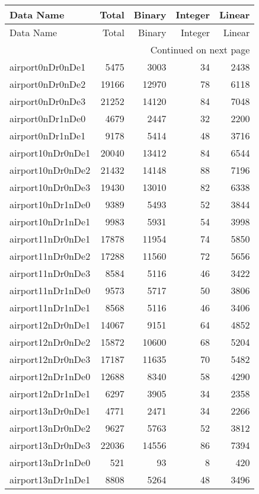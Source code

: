 \begin{longtable}{lrrrr}
\toprule
Data Name & Total & Binary & Integer & Linear \\
\midrule
\endfirsthead
\toprule
Data Name & Total & Binary & Integer & Linear \\
\midrule
\endhead
\midrule
\multicolumn{5}{r}{Continued on next page} \\
\midrule
\endfoot
\bottomrule
\endlastfoot
airport0nDr0nDe1 & 5475 & 3003 & 34 & 2438 \\
airport0nDr0nDe2 & 19166 & 12970 & 78 & 6118 \\
airport0nDr0nDe3 & 21252 & 14120 & 84 & 7048 \\
airport0nDr1nDe0 & 4679 & 2447 & 32 & 2200 \\
airport0nDr1nDe1 & 9178 & 5414 & 48 & 3716 \\
airport10nDr0nDe1 & 20040 & 13412 & 84 & 6544 \\
airport10nDr0nDe2 & 21432 & 14148 & 88 & 7196 \\
airport10nDr0nDe3 & 19430 & 13010 & 82 & 6338 \\
airport10nDr1nDe0 & 9389 & 5493 & 52 & 3844 \\
airport10nDr1nDe1 & 9983 & 5931 & 54 & 3998 \\
airport11nDr0nDe1 & 17878 & 11954 & 74 & 5850 \\
airport11nDr0nDe2 & 17288 & 11560 & 72 & 5656 \\
airport11nDr0nDe3 & 8584 & 5116 & 46 & 3422 \\
airport11nDr1nDe0 & 9573 & 5717 & 50 & 3806 \\
airport11nDr1nDe1 & 8568 & 5116 & 46 & 3406 \\
airport12nDr0nDe1 & 14067 & 9151 & 64 & 4852 \\
airport12nDr0nDe2 & 15872 & 10600 & 68 & 5204 \\
airport12nDr0nDe3 & 17187 & 11635 & 70 & 5482 \\
airport12nDr1nDe0 & 12688 & 8340 & 58 & 4290 \\
airport12nDr1nDe1 & 6297 & 3905 & 34 & 2358 \\
airport13nDr0nDe1 & 4771 & 2471 & 34 & 2266 \\
airport13nDr0nDe2 & 9627 & 5763 & 52 & 3812 \\
airport13nDr0nDe3 & 22036 & 14556 & 86 & 7394 \\
airport13nDr1nDe0 & 521 & 93 & 8 & 420 \\
airport13nDr1nDe1 & 8808 & 5264 & 48 & 3496 \\

\end{longtable}
